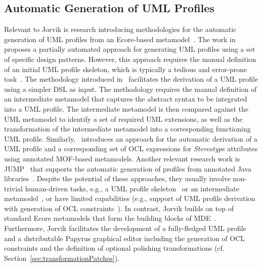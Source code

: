 \subsection{Automatic Generation of UML Profiles}
Relevant to Jorvik is research introducing methodologies for the automatic generation of UML profiles from an Ecore-based metamodel~\cite{Kraas17}. 
The work in~\cite{Lagarde2008:FASE} proposes a partially automated approach for generating UML profiles using a set of specific design patterns. However, this approach requires the manual definition of an initial UML profile skeleton, which is typically a tedious and error-prone task~\cite{Wimmer2009:IJWIS}. 
The methodology introduced in~\cite{Giachetti2008:ER,Giachetti2009:CAISE} facilitates the derivation of a UML profile using a simpler DSL as input.
The methodology requires the manual definition of an intermediate metamodel that captures the abstract syntax to be integrated into a UML profile. 
The intermediate metamodel is then compared against the UML metamodel to identify a set of required UML extensions, as well as the transformation of the intermediate metamodel into a corresponding functioning UML profile. 
Similarly,~\cite{Kraas17} introduces an approach for the automatic derivation of a UML profile and a corresponding set of OCL expressions for \textit{Stereotype} attributes using annotated MOF-based metamodels.
Another relevant research work is JUMP~\cite{Bergmayr2014:MODELS} that supports the automatic generation of profiles from annotated Java libraries~\cite{Bergmayr2014:MODELS}.
Despite the potential of these approaches, they usually involve non-trivial human-driven tasks, e.g., a UML profile skeleton~\cite{Lagarde2008:FASE} or an intermediate metamodel~\cite{Giachetti2008:ER,Giachetti2009:CAISE}, or have limited capabilities (e.g., support of UML profile derivation with generation of OCL constraints~\cite{Kraas17}). 
In contrast, Jorvik builds on top of standard Ecore metamodels that form the building blocks of MDE~\cite{omg2014meta}. 
Furthermore, Jorvik facilitates the development of a fully-fledged UML profile and a distributable Papyrus graphical editor including the generation of OCL constraints and the definition of optional polishing transformations (cf. 
Section~\ref{sec:transformationPatches}).


